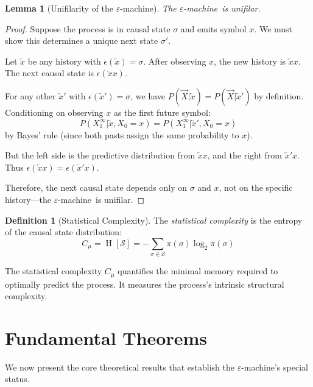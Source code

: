 \documentclass[11pt,twocolumn]{article}
\theoremstyle{plain}
\newtheorem{lemma}[theorem]{Lemma}
\theoremstyle{definition}
\newtheorem{definition}[theorem]{Definition}
\theoremstyle{remark}
\newcommand{\eps}{\varepsilon}
\newcommand{\eM}{$\eps$-machine}
\newcommand{\Cmu}{C_\mu}
\newcommand{\calS}{\mathcal{S}}
\newcommand{\Future}{\overrightarrow{X}}
\newcommand{\past}{\overleftarrow{x}}
\DeclareMathOperator{\Ent}{H}
\begin{document}
\begin{lemma}[Unifilarity of the \eM]
\label{lem:unifilarity}
The \eM\ is unifilar.
\end{lemma}
\begin{proof}
Suppose the process is in causal state $\sigma$ and emits symbol $x$. We must show this determines a unique next state $\sigma'$.

Let $\past$ be any history with $\epsilon(\past) = \sigma$. After observing $x$, the new history is $\past x$. The next causal state is $\epsilon(\past x)$.

For any other $\past'$ with $\epsilon(\past') = \sigma$, we have $P(\Future | \past) = P(\Future | \past')$ by definition. Conditioning on observing $x$ as the first future symbol:
\begin{equation}
    P(X_1^\infty | \past, X_0 = x) = P(X_1^\infty | \past', X_0 = x)
\end{equation}
by Bayes' rule (since both pasts assign the same probability to $x$).

But the left side is the predictive distribution from $\past x$, and the right from $\past' x$. Thus $\epsilon(\past x) = \epsilon(\past' x)$.

Therefore, the next causal state depends only on $\sigma$ and $x$, not on the specific history---the \eM\ is unifilar.
\end{proof}

\begin{definition}[Statistical Complexity]
The \emph{statistical complexity} is the entropy of the causal state distribution:
\begin{equation}
    \Cmu = \Ent[\calS] = -\sum_{\sigma \in \calS} \pi(\sigma) \log_2 \pi(\sigma)
\end{equation}
\end{definition}

The statistical complexity $\Cmu$ quantifies the minimal memory required to optimally predict the process. It measures the process's intrinsic structural complexity.

\section{Fundamental Theorems}
\label{sec:theorems}

We now present the core theoretical results that establish the \eM's special status.
\end{document}
